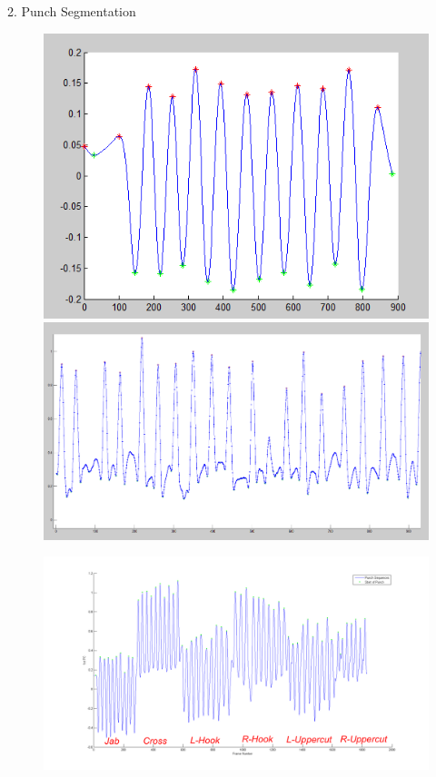 \documentclass[ %
                    author={Liam O'Shea},
                supervisor={Dr. Sion Hannuna},
                     title={ZeroToHero},
                  subtitle={},
                    degree={Bsc},
                      year={2014} ]{poster}
\begin{document}
\begin{frame}{}
\begin{columns}[t]
\begin{column}{0.422\linewidth}
\begin{block}{\normalsize 2. Punch Segmentation}

    \begin{figure}[h]
        \includegraphics[height=0.10\textheight]{images/jabseg}
        \includegraphics[height=0.10\textheight]{images/crossseg}
    \end{figure}

    \begin{figure}[h]
        \includegraphics[height=0.15\textheight, width=0.35\textheight]{images/punchseq-pdf}
    \end{figure}
    \end{block}
    \end{column}
\end{columns}





\end{frame}
\end{document}
